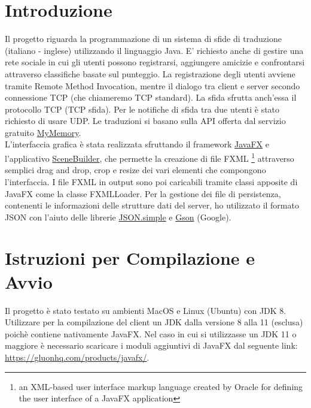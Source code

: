\documentclass{article}
\begin{document}
\section{Introduzione}
Il progetto riguarda la programmazione di un sistema di sfide di traduzione (italiano - inglese) utilizzando il linguaggio Java. E' richiesto anche di gestire una rete sociale in cui gli utenti possono registrarsi, aggiungere amicizie e confrontarsi attraverso classifiche basate sul punteggio. La registrazione degli utenti avviene tramite Remote Method Invocation, mentre il dialogo tra client e server secondo connessione TCP (che chiameremo TCP standard). La sfida sfrutta anch'essa il protocollo TCP (TCP sfida). Per le notifiche di sfida tra due utenti è stato richiesto di usare UDP. Le traduzioni si basano sulla API offerta dal servizio gratuito \href{https://mymemory.translated.net/doc/spec.php}{MyMemory}. \\
L'interfaccia grafica è stata realizzata sfruttando il framework \href{https://docs.oracle.com/javase/8/javafx/get-started-tutorial/jfx-overview.htm}{JavaFX} e l'applicativo \href{https://gluonhq.com/products/scene-builder/}{SceneBuilder}, che permette la creazione di file FXML \footnote{an XML-based user interface markup language created by Oracle for defining the user interface of a JavaFX application} attraverso semplici drag and drop, crop e resize dei vari elementi che compongono l'interfaccia. I file FXML in output sono poi caricabili tramite classi apposite di JavaFX come la classe FXMLLoader. Per la gestione dei file di persistenza, contenenti le informazioni delle strutture dati del server, ho utilizzato il formato JSON con l'aiuto delle librerie \href{https://code.google.com/archive/p/json-simple/}{JSON.simple} e \href{https://github.com/google/gson/blob/master/UserGuide.md}{Gson} (Google).

\section{Istruzioni per Compilazione e Avvio}
Il progetto è stato testato su ambienti MacOS e Linux (Ubuntu) con JDK 8. Utilizzare per la compilazione del client un JDK dalla versione 8 alla 11 (esclusa) poichè contiene nativamente JavaFX. Nel caso in cui si utilizzasse un JDK 11 o maggiore è necessario scaricare i moduli aggiuntivi di JavaFX dal seguente link: \href{https://gluonhq.com/products/javafx/}{https://gluonhq.com/products/javafx/}. \newline 
\end{document}
